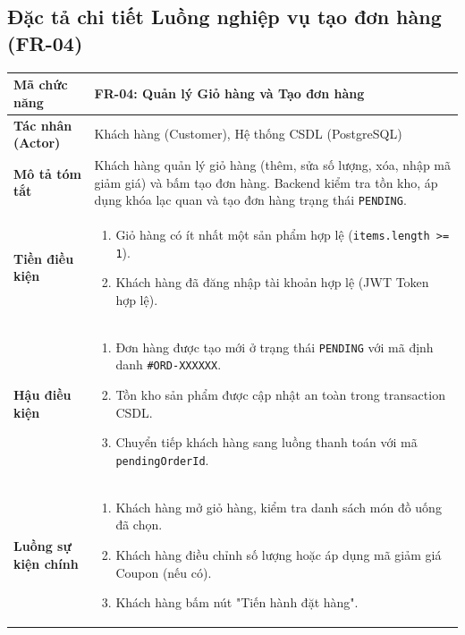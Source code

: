\documentclass[a4paper]{article}
\begin{document}
\subsection{Đặc tả chi tiết Luồng nghiệp vụ tạo đơn hàng (FR-04)}
\begin{table}[h!]
\centering
\small
\begin{tabular}{|p{3.5cm}|p{11.5cm}|}
\hline
\textbf{Mã chức năng} & \textbf{FR-04: Quản lý Giỏ hàng và Tạo đơn hàng} \\ \hline
\textbf{Tác nhân (Actor)} & Khách hàng (Customer), Hệ thống CSDL (PostgreSQL) \\ \hline
\textbf{Mô tả tóm tắt} & Khách hàng quản lý giỏ hàng (thêm, sửa số lượng, xóa, nhập mã giảm giá) và bấm tạo đơn hàng. Backend kiểm tra tồn kho, áp dụng khóa lạc quan và tạo đơn hàng trạng thái \texttt{PENDING}. \\ \hline
\textbf{Tiền điều kiện} & 
\begin{enumerate}
    \vspace{-0.2cm}
    \item Giỏ hàng có ít nhất một sản phẩm hợp lệ (\texttt{items.length >= 1}).
    \item Khách hàng đã đăng nhập tài khoản hợp lệ (JWT Token hợp lệ).
    \vspace{-0.2cm}
\end{enumerate} \\ \hline
\textbf{Hậu điều kiện} & 
\begin{enumerate}
    \vspace{-0.2cm}
    \item Đơn hàng được tạo mới ở trạng thái \texttt{PENDING} với mã định danh \texttt{\#ORD-XXXXXX}.
    \item Tồn kho sản phẩm được cập nhật an toàn trong transaction CSDL.
    \item Chuyển tiếp khách hàng sang luồng thanh toán với mã \texttt{pendingOrderId}.
    \vspace{-0.2cm}
\end{enumerate} \\ \hline
\textbf{Luồng sự kiện chính} & 
\begin{enumerate}
    \vspace{-0.2cm}
    \item Khách hàng mở giỏ hàng, kiểm tra danh sách món đồ uống đã chọn.
    \item Khách hàng điều chỉnh số lượng hoặc áp dụng mã giảm giá Coupon (nếu có).
    \item Khách hàng bấm nút "Tiến hành đặt hàng".

\end{enumerate}
\end{tabular}
\end{table}
\end{document}
